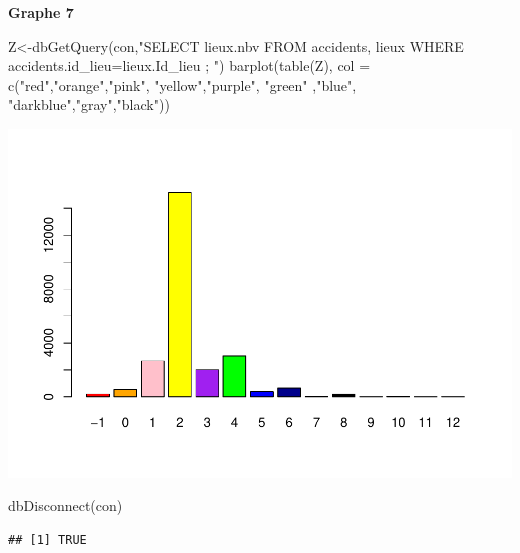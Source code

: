 \documentclass[mstat,12pt]{unswthesis}
\newenvironment{Shaded}{\begin{snugshade}}{\end{snugshade}}
\newcommand{\AttributeTok}[1]{\textcolor[rgb]{0.77,0.63,0.00}{#1}}
\newcommand{\FunctionTok}[1]{\textcolor[rgb]{0.00,0.00,0.00}{#1}}
\newcommand{\NormalTok}[1]{#1}
\newcommand{\OtherTok}[1]{\textcolor[rgb]{0.56,0.35,0.01}{#1}}
\newcommand{\StringTok}[1]{\textcolor[rgb]{0.31,0.60,0.02}{#1}}
\begin{document}
\medskip

\textbf{Graphe 7 }

\begin{Shaded}
\begin{Highlighting}[]
\NormalTok{Z}\OtherTok{\textless{}{-}}\FunctionTok{dbGetQuery}\NormalTok{(con,}\StringTok{"SELECT lieux.nbv FROM accidents,}
\StringTok{lieux WHERE accidents.id\_lieu=lieux.Id\_lieu ;}
\StringTok{"}\NormalTok{)}
\FunctionTok{barplot}\NormalTok{(}\FunctionTok{table}\NormalTok{(Z), }\AttributeTok{col =} \FunctionTok{c}\NormalTok{(}\StringTok{"red"}\NormalTok{,}\StringTok{"orange"}\NormalTok{,}\StringTok{"pink"}\NormalTok{, }\StringTok{"yellow"}\NormalTok{,}\StringTok{"purple"}\NormalTok{, }\StringTok{"green"}
\NormalTok{                        ,}\StringTok{"blue"}\NormalTok{, }\StringTok{"darkblue"}\NormalTok{,}\StringTok{"gray"}\NormalTok{,}\StringTok{"black"}\NormalTok{))}
\end{Highlighting}
\end{Shaded}

\includegraphics{rapport-G04_files/figure-latex/unnamed-chunk-18-1.pdf}

\begin{Shaded}
\begin{Highlighting}[]
\FunctionTok{dbDisconnect}\NormalTok{(con)}
\end{Highlighting}
\end{Shaded}

\begin{verbatim}
## [1] TRUE
\end{verbatim}
\end{document}
